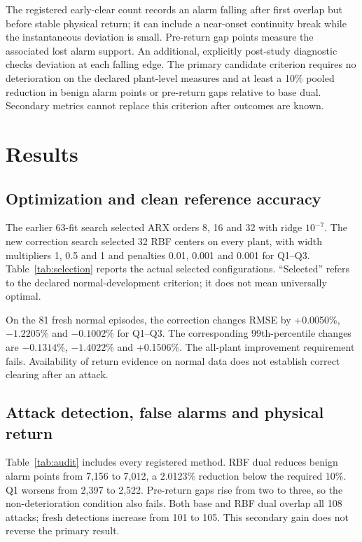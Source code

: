 \documentclass[11pt]{article}
\begin{document}
The registered early-clear count records an alarm falling after first overlap but before stable physical return; it can include a near-onset continuity break while the instantaneous deviation is small. Pre-return gap points measure the associated lost alarm support. An additional, explicitly post-study diagnostic checks deviation at each falling edge. The primary candidate criterion requires no deterioration on the declared plant-level measures and at least a 10\% pooled reduction in benign alarm points or pre-return gaps relative to base dual. Secondary metrics cannot replace this criterion after outcomes are known.

\section{Results}
\subsection{Optimization and clean reference accuracy}
The earlier 63-fit search selected ARX orders 8, 16 and 32 with ridge $10^{-7}$. The new correction search selected 32 RBF centers on every plant, with width multipliers 1, 0.5 and 1 and penalties 0.01, 0.001 and 0.001 for Q1--Q3. Table~\ref{tab:selection} reports the actual selected configurations. ``Selected'' refers to the declared normal-development criterion; it does not mean universally optimal.

\begin{table}[t]\centering\small
\caption{Selected candidate settings and fresh-normal changes relative to the uncorrected reference. A positive error change is worse.}\label{tab:selection}

\end{table}

On the 81 fresh normal episodes, the correction changes RMSE by +0.0050\%, $-1.2205$\% and $-0.1002$\% for Q1--Q3. The corresponding 99th-percentile changes are $-0.1314$\%, $-1.4022$\% and +0.1506\%. The all-plant improvement requirement fails. Availability of return evidence on normal data does not establish correct clearing after an attack.

\subsection{Attack detection, false alarms and physical return}
Table~\ref{tab:audit} includes every registered method. RBF dual reduces benign alarm points from 7,156 to 7,012, a 2.0123\% reduction below the required 10\%. Q1 worsens from 2,397 to 2,522. Pre-return gaps rise from two to three, so the non-deterioration condition also fails. Both base and RBF dual overlap all 108 attacks; fresh detections increase from 101 to 105. This secondary gain does not reverse the primary result.
\end{document}
